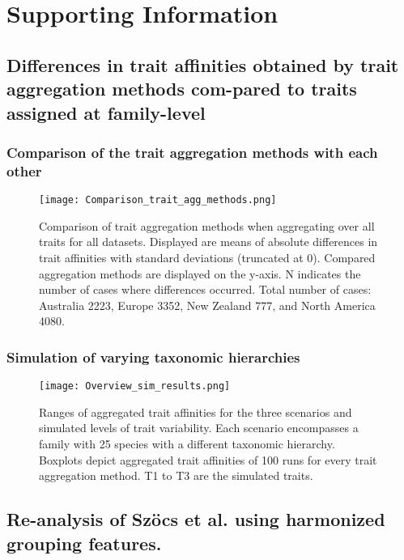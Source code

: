 \documentclass[../Draft_harmonization_paper.tex]{subfiles}
\begin{document}
\section*{Supporting Information}
\label{sec:SI}

\subsection*{Differences in trait affinities obtained by trait aggregation methods com-pared to traits assigned at family-level}

\subsubsection*{Comparison of the trait aggregation methods with each other}
\label{sec:compa_aggr_methods}

\begin{figure}[H]
    \centering
    \texttt{[image: Comparison\_trait\_agg\_methods.png]}
    \caption{Comparison of trait aggregation methods when aggregating over all traits for all datasets. Displayed are means of absolute differences in trait affinities with standard deviations (truncated at 0). Compared aggregation methods are displayed on the y-axis. N indicates the number of cases where differences occurred. Total number of cases: Australia 2223, Europe 3352, New Zealand 777, and North America 4080.}
    \label{fig:comp_aggr_methods}
\end{figure}

\subsubsection*{Simulation of varying taxonomic hierarchies}

\begin{figure}[H]
    \centering
    \texttt{[image: Overview\_sim\_results.png]}
    \caption{Ranges of aggregated trait affinities for the three scenarios and simulated levels of trait variability. Each scenario encompasses a family with 25 species with a different taxonomic hierarchy. Boxplots depict aggregated trait affinities of 100 runs for every trait aggregation method. T1 to T3 are the simulated traits.}
    \label{fig:overview_sim_results}
\end{figure}

\newpage

\subsection*{Re-analysis of Szöcs et al. using harmonized grouping features.}
\label{subsec:SI_szoecs_reanalysis}
\end{document}
